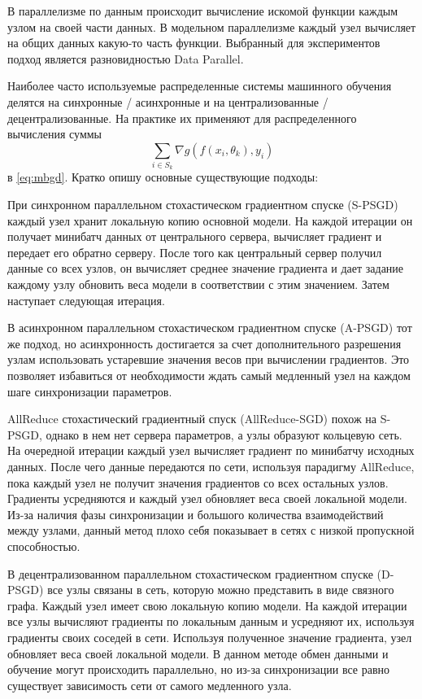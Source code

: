 \documentclass[a4paper,article,14pt]{extarticle}
\begin{document}
В параллелизме по данным происходит вычисление искомой функции каждым узлом на своей части данных. В модельном параллелизме каждый узел вычисляет на общих данных какую-то часть функции. Выбранный для экспериментов подход является разновидностью Data Parallel.

Наиболее часто используемые распределенные системы машинного обучения делятся на синхронные / асинхронные и на централизованные / децентрализованные. На практике их применяют для распределенного вычисления суммы
\begin{equation}
\sum_{i\in S_k}\nabla g(f(x_i, \theta_k), y_i)
\end{equation}
в \ref{eq:mbgd}. Кратко опишу основные существующие подходы:

При синхронном параллельном стохастическом градиентном спуске (S-PSGD) \cite{o1} каждый узел хранит локальную копию основной модели. На каждой итерации он получает минибатч данных от центрального сервера, вычисляет градиент и передает его обратно серверу. После того как центральный сервер получил данные со всех узлов, он вычисляет среднее значение градиента и дает задание каждому узлу обновить веса модели в соответствии с этим значением. Затем наступает следующая итерация.

В асинхронном параллельном стохастическом градиентном спуске (A-PSGD) \cite{o2, o3, o4, o5} тот же подход, но асинхронность достигается за счет дополнительного разрешения узлам использовать устаревшие значения весов при вычислении градиентов. Это позволяет избавиться от необходимости ждать самый медленный узел на каждом шаге синхронизации параметров.

AllReduce стохастический градиентный спуск (AllReduce-SGD) \cite{o6, o7} похож на  S-PSGD,  однако в нем нет сервера параметров, а узлы образуют кольцевую сеть. На очередной итерации каждый узел вычисляет градиент по минибатчу исходных данных. После чего данные передаются по сети, используя парадигму AllReduce, пока каждый узел не получит значения градиентов со всех остальных узлов. Градиенты усредняются и каждый узел обновляет веса своей локальной модели. Из-за наличия фазы синхронизации и большого количества взаимодействий между узлами, данный метод плохо себя показывает в сетях с низкой пропускной способностью.

В децентрализованном параллельном стохастическом градиентном спуске (D-PSGD) \cite{o8, o9, o10} все узлы связаны в сеть, которую можно представить в виде связного графа. Каждый узел имеет свою локальную копию модели. На каждой итерации все узлы вычисляют градиенты по локальным данным и усредняют их, используя градиенты своих соседей в сети. Используя полученное значение градиента, узел обновляет веса своей локальной модели. В данном методе обмен данными и обучение могут происходить параллельно, но из-за синхронизации все равно существует зависимость сети от самого медленного узла.
\end{document}
